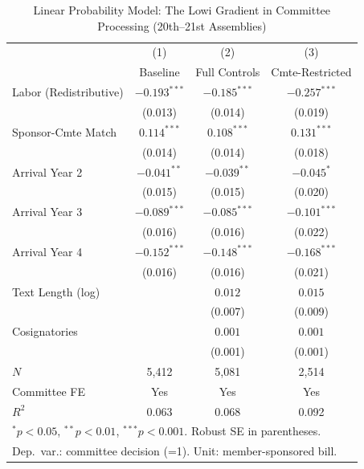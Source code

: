 \documentclass[11pt]{article}
\begin{document}
\begin{table}[H]
\centering
\caption{Linear Probability Model: The Lowi Gradient in Committee Processing (20th--21st Assemblies)}
\label{tab:main}
\begin{tabular}{lccc}
\toprule
 & (1) & (2) & (3) \\
 & Baseline & Full Controls & Cmte-Restricted \\
\midrule
Labor (Redistributive)  & $-0.193^{***}$ & $-0.185^{***}$ & $-0.257^{***}$ \\
                         & (0.013)        & (0.014)        & (0.019)        \\[4pt]
Sponsor-Cmte Match       & $0.114^{***}$  & $0.108^{***}$  & $0.131^{***}$  \\
                         & (0.014)        & (0.014)        & (0.018)        \\[4pt]
Arrival Year 2           & $-0.041^{**}$  & $-0.039^{**}$  & $-0.045^{*}$   \\
                         & (0.015)        & (0.015)        & (0.020)        \\[4pt]
Arrival Year 3           & $-0.089^{***}$ & $-0.085^{***}$ & $-0.101^{***}$ \\
                         & (0.016)        & (0.016)        & (0.022)        \\[4pt]
Arrival Year 4           & $-0.152^{***}$ & $-0.148^{***}$ & $-0.168^{***}$ \\
                         & (0.016)        & (0.016)        & (0.021)        \\[4pt]
Text Length (log)        &                & $0.012$        & $0.015$        \\
                         &                & (0.007)        & (0.009)        \\[4pt]
Cosignatories            &                & $0.001$        & $0.001$        \\
                         &                & (0.001)        & (0.001)        \\
\midrule
$N$                      & 5,412          & 5,081          & 2,514          \\
Committee FE             & Yes            & Yes            & Yes            \\
$R^2$                    & 0.063          & 0.068          & 0.092          \\
\bottomrule
\multicolumn{4}{l}{\footnotesize $^{*}p<0.05$, $^{**}p<0.01$, $^{***}p<0.001$. Robust SE in parentheses.} \\
\multicolumn{4}{l}{\footnotesize Dep.\ var.: committee decision (=1). Unit: member-sponsored bill.} \\
\end{tabular}
\end{table}
\end{document}
